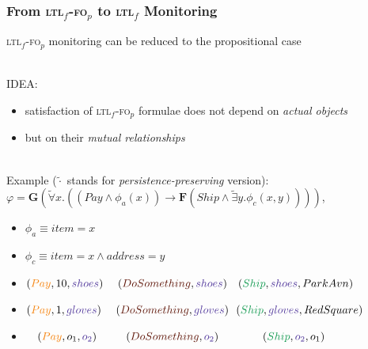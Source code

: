 \documentclass[xcolor=dvipsnames,aspectratio=169]{beamer}
\newcommand{\always}{\mathbf{G}\xspace}
\newcommand{\eventually}{\mathbf{F}\xspace}
\newcommand{\ltlf}{\textsc{ltl}$_f$\xspace}
\newcommand{\ltlffop}{\ltlf-\textsc{fo}$_p$\xspace}
\newcommand{\green}[1]{\textcolor{ForestGreen}{#1}}
\newcommand{\orange}[1]{\textcolor{BurntOrange}{#1}}
\newcommand{\violet}[1]{\textcolor{Violet}{#1}}
\newcommand{\sepia}[1]{\textcolor{Sepia}{#1}}
\begin{document}
\begin{frame}
\frametitle{From \ltlffop to \ltlf Monitoring}


\ltlffop  monitoring can be reduced to the propositional case

~\\


IDEA: 
\begin{itemize}
	\item satisfaction of \ltlffop formulae does not depend on \emph{actual objects}
	\item but on their \emph{mutual relationships}
\end{itemize}

~\\

Example ($\tilde{\cdot}$ stands for \emph{persistence-preserving} version):\\
$\varphi=\always(\tilde\forall x.((Pay\land\phi_a(x)) \rightarrow \eventually (Ship \land\tilde\exists y.\phi_c(x, y))))$,

\begin{itemize}
	\item $\phi_a\equiv item=x$ 
	\item $\phi_c\equiv item= x \land address=y$ 
\end{itemize}

\begin{itemize}
	\item $(\orange{Pay},10,\violet{shoes})~~~~(\sepia{DoSomething},\violet{shoes})~~~(\green{Ship},\violet{shoes},Park Avn)$
	\item $(\orange{Pay},1,\violet{gloves})~~~~(\sepia{DoSomething},\violet{gloves})~~(\green{Ship},\violet{gloves},Red Square)$
	\item $~~~(\orange{Pay},o_1,\violet{o_2})~~~~~~~~(\sepia{DoSomething},\violet{o_2})~~~~~~~~~~~~(\green{Ship},\violet{o_2},o_1)$
\end{itemize}
\end{frame}

\end{document}

